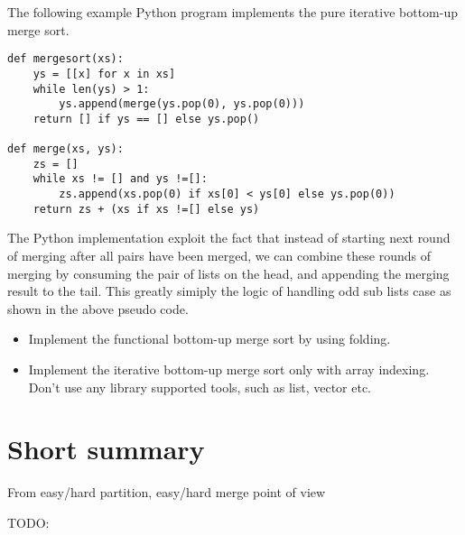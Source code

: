 \documentclass{article}
\begin{document}
The following example Python program implements the pure iterative bottom-up merge sort.

\lstset{language=Python}
\begin{lstlisting}
def mergesort(xs):
    ys = [[x] for x in xs]
    while len(ys) > 1:
        ys.append(merge(ys.pop(0), ys.pop(0)))
    return [] if ys == [] else ys.pop()

def merge(xs, ys):
    zs = []
    while xs != [] and ys !=[]:
        zs.append(xs.pop(0) if xs[0] < ys[0] else ys.pop(0))
    return zs + (xs if xs !=[] else ys)
\end{lstlisting}

The Python implementation exploit the fact that instead of starting next round of merging
after all pairs have been merged, we can combine these rounds of merging by consuming
the pair of lists on the head, and appending the merging result to the tail. This greatly simiply
the logic of handling odd sub lists case as shown in the above pseudo code.

\begin{Exercise}
\begin{itemize}
\item Implement the functional bottom-up merge sort by using folding.
\item Implement the iterative bottom-up merge sort only with array indexing. Don't use any library
supported tools, such as list, vector etc.
\end{itemize}
\end{Exercise}

\section{Short summary} 
From easy/hard partition, easy/hard merge point of view

TODO:
\end{document}
